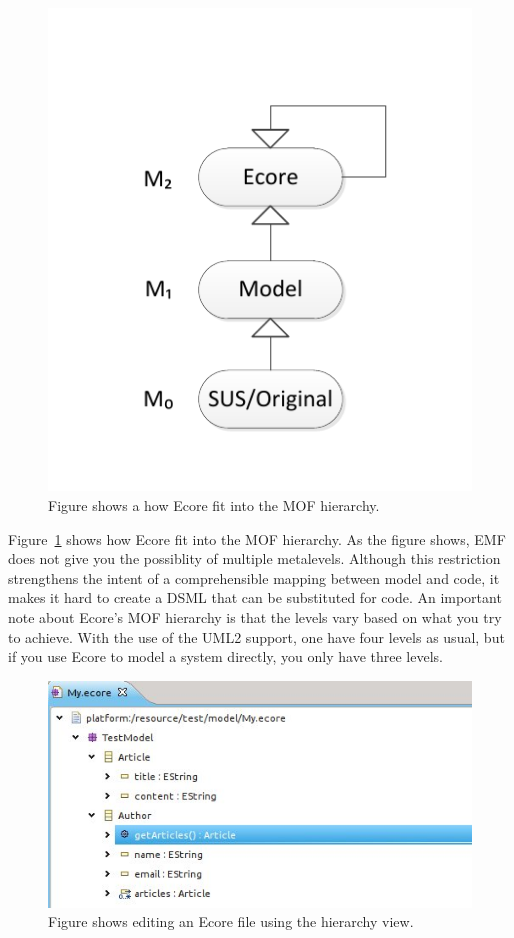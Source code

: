 \begin{figure}[htpb]
    \centering
    \centerline{\includegraphics[scale=0.8]{images/ecoremof.pdf}}
    \caption[Ecore and MOF]{Figure shows a how Ecore fit into the MOF hierarchy.}
    \label{fig:ecoremof}
\end{figure}
Figure~\ref{fig:ecoremof} shows how Ecore fit into the MOF hierarchy. As the figure shows, EMF does not give you the possiblity of multiple metalevels. Although this restriction strengthens the intent of a comprehensible mapping between model and code, it makes it hard to create a DSML that can be substituted for code. An important note about Ecore's MOF hierarchy is that the levels vary based on what you try to achieve. With the use of the UML2 support, one have four levels as usual, but if you use Ecore to model a system directly, you only have three levels.

\begin{figure}[htpb]
    \centering
    \centerline{\includegraphics[scale=0.8]{images/emf_hierarchy.jpeg}}
    \caption[Creating an Ecore file]{Figure shows editing an Ecore file using the hierarchy view.}
    \label{fig:emf_hierarchy}
\end{figure}

